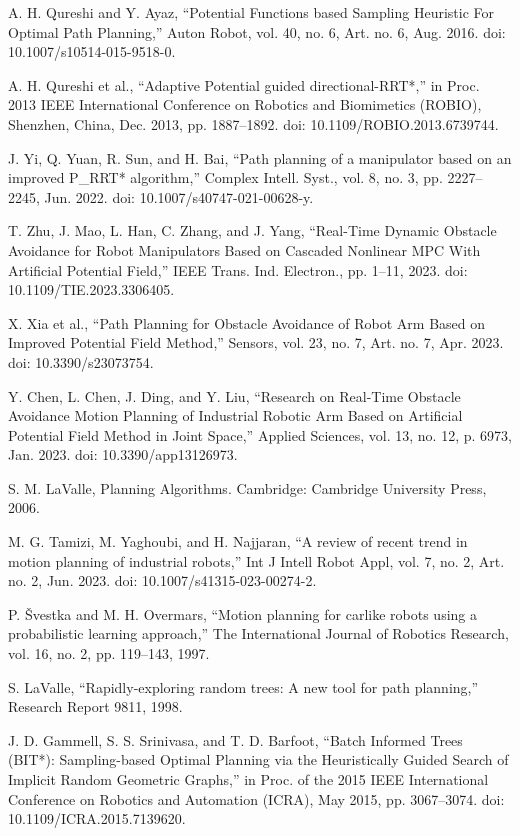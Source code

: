 \documentclass[letterpaper, 10 pt, conference]{ieeeconf}  %
\begin{document}
\begin{thebibliography}{99}
 A. H. Qureshi and Y. Ayaz, “Potential Functions based Sampling Heuristic For Optimal Path Planning,” Auton Robot, vol. 40, no. 6, Art. no. 6, Aug. 2016. doi: 10.1007/s10514-015-9518-0.

 A. H. Qureshi et al., “Adaptive Potential guided directional-RRT*,” in Proc. 2013 IEEE International Conference on Robotics and Biomimetics (ROBIO), Shenzhen, China, Dec. 2013, pp. 1887–1892. doi: 10.1109/ROBIO.2013.6739744.

 J. Yi, Q. Yuan, R. Sun, and H. Bai, “Path planning of a manipulator based on an improved P\_RRT* algorithm,” Complex Intell. Syst., vol. 8, no. 3, pp. 2227–2245, Jun. 2022. doi: 10.1007/s40747-021-00628-y.

 T. Zhu, J. Mao, L. Han, C. Zhang, and J. Yang, “Real-Time Dynamic Obstacle Avoidance for Robot Manipulators Based on Cascaded Nonlinear MPC With Artificial Potential Field,” IEEE Trans. Ind. Electron., pp. 1–11, 2023. doi: 10.1109/TIE.2023.3306405.

 X. Xia et al., “Path Planning for Obstacle Avoidance of Robot Arm Based on Improved Potential Field Method,” Sensors, vol. 23, no. 7, Art. no. 7, Apr. 2023. doi: 10.3390/s23073754.

 Y. Chen, L. Chen, J. Ding, and Y. Liu, “Research on Real-Time Obstacle Avoidance Motion Planning of Industrial Robotic Arm Based on Artificial Potential Field Method in Joint Space,” Applied Sciences, vol. 13, no. 12, p. 6973, Jan. 2023. doi: 10.3390/app13126973.

 S. M. LaValle, Planning Algorithms. Cambridge: Cambridge University Press, 2006.

 M. G. Tamizi, M. Yaghoubi, and H. Najjaran, “A review of recent trend in motion planning of industrial robots,” Int J Intell Robot Appl, vol. 7, no. 2, Art. no. 2, Jun. 2023. doi: 10.1007/s41315-023-00274-2.

 P. {\v{S}}vestka and M. H. Overmars, “Motion planning for carlike robots using a probabilistic learning approach,” The International Journal of Robotics Research, vol. 16, no. 2, pp. 119–143, 1997.

 S. LaValle, “Rapidly-exploring random trees: A new tool for path planning,” Research Report 9811, 1998.

 J. D. Gammell, S. S. Srinivasa, and T. D. Barfoot, “Batch Informed Trees (BIT*): Sampling-based Optimal Planning via the Heuristically Guided Search of Implicit Random Geometric Graphs,” in Proc. of the 2015 IEEE International Conference on Robotics and Automation (ICRA), May 2015, pp. 3067–3074. doi: 10.1109/ICRA.2015.7139620.


\end{thebibliography}
\end{document}
